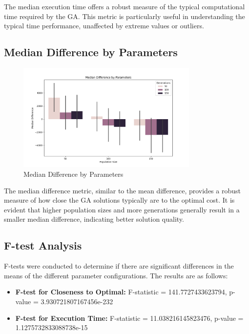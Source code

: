 \documentclass[
]{article}
\begin{document}
    The median execution time offers a robust measure of the typical computational time required by the GA. This metric is particularly useful in understanding the typical time performance, unaffected by extreme values or outliers.

    \subsection{Median Difference by Parameters}\label{subsec:median-difference-by-parameters}
    \begin{figure}[H]
        \centering
        \includegraphics[width=0.8\textwidth]{genetic_algorithm/median_difference.png}
        \caption{Median Difference by Parameters}
        \label{fig:median_difference_ga}
    \end{figure}

    The median difference metric, similar to the mean difference, provides a robust measure of how close the GA solutions typically are to the optimal cost. It is evident that higher population sizes and more generations generally result in a smaller median difference, indicating better solution quality.

    \subsection{F-test Analysis}\label{subsec:f-test-analysis}
    F-tests were conducted to determine if there are significant differences in the means of the different parameter configurations. The results are as follows:
    \begin{itemize}
        \item \textbf{F-test for Closeness to Optimal:} F-statistic = 141.7727433623794, p-value = 3.930721807167456e-232
        \item \textbf{F-test for Execution Time:} F-statistic = 11.038216145823476, p-value = 1.1275732833088738e-15
    \end{itemize}
\end{document}

